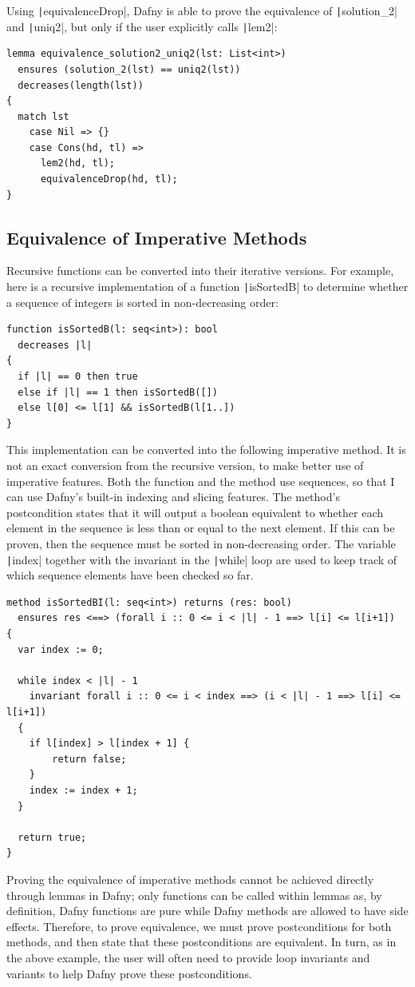%
Using \texttt|equivalenceDrop|, Dafny is able to prove the equivalence of \texttt|solution_2| and \texttt|uniq2|, but only if the user explicitly calls \texttt|lem2|:
\begin{verbatim}
lemma equivalence_solution2_uniq2(lst: List<int>)
  ensures (solution_2(lst) == uniq2(lst))
  decreases(length(lst))
{
  match lst
    case Nil => {}
    case Cons(hd, tl) =>
      lem2(hd, tl);
      equivalenceDrop(hd, tl);
}
\end{verbatim}
%

\subsection{Equivalence of Imperative Methods}\label{sec:imperative-equivalence}

Recursive functions can be converted into their iterative versions. For example, here is a recursive implementation of a function \texttt|isSortedB| to determine whether a sequence of integers is sorted in non-decreasing order:
\begin{verbatim}
function isSortedB(l: seq<int>): bool
  decreases |l|
{
  if |l| == 0 then true
  else if |l| == 1 then isSortedB([])
  else l[0] <= l[1] && isSortedB(l[1..])
}
\end{verbatim}
%
This implementation can be converted into the following imperative method. It is not an exact conversion from the recursive version, to make better use of imperative features. Both the function and the method use sequences, so that I can use Dafny's built-in indexing and slicing features. The method's postcondition states that it will output a boolean equivalent to whether each element in the sequence is less than or equal to the next element. If this can be proven, then the sequence must be sorted in non-decreasing order. The variable \texttt|index| together with the invariant in the \texttt|while| loop are used to keep track of which sequence elements have been checked so far.
\begin{verbatim}
method isSortedBI(l: seq<int>) returns (res: bool)
  ensures res <==> (forall i :: 0 <= i < |l| - 1 ==> l[i] <= l[i+1])
{
  var index := 0;

  while index < |l| - 1
    invariant forall i :: 0 <= i < index ==> (i < |l| - 1 ==> l[i] <= l[i+1])
  {
    if l[index] > l[index + 1] {
        return false;
    }
    index := index + 1;
  }

  return true;
}
\end{verbatim}
%
Proving the equivalence of imperative methods cannot be achieved directly through lemmas in Dafny; only functions can be called within lemmas as, by definition, Dafny functions are pure while Dafny methods are allowed to have side effects. Therefore, to prove equivalence, we must prove postconditions for both methods, and then state that these postconditions are equivalent. In turn, as in the above example, the user will often need to provide loop invariants and variants to help Dafny prove these postconditions.

